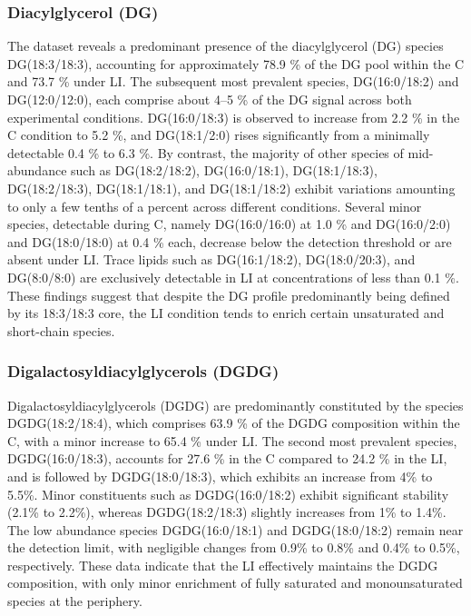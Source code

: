 \documentclass[10pt,letterpaper]{article}
\begin{document}
\subsubsection*{Diacylglycerol (DG)} 
The dataset reveals a predominant presence of the diacylglycerol (DG) species DG(18:3/18:3), accounting for approximately 78.9 \% of the DG pool within the C and 73.7 \% under LI. The subsequent most prevalent species, DG(16:0/18:2) and DG(12:0/12:0), each comprise about 4–5 \% of the DG signal across both experimental conditions. DG(16:0/18:3) is observed to increase from 2.2 \% in the C condition to 5.2 \%, and DG(18:1/2:0) rises significantly from a minimally detectable 0.4 \% to 6.3 \%. By contrast, the majority of other species of mid-abundance such as DG(18:2/18:2), DG(16:0/18:1), DG(18:1/18:3), DG(18:2/18:3), DG(18:1/18:1), and DG(18:1/18:2) exhibit variations amounting to only a few tenths of a percent across different conditions. Several minor species, detectable during C, namely DG(16:0/16:0) at 1.0 \% and DG(16:0/2:0) and DG(18:0/18:0) at 0.4 \% each, decrease below the detection threshold or are absent under LI. Trace lipids such as DG(16:1/18:2), DG(18:0/20:3), and DG(8:0/8:0) are exclusively detectable in LI  at concentrations of less than 0.1 \%. These findings suggest that despite the DG profile predominantly being defined by its 18:3/18:3 core, the LI condition tends to enrich certain unsaturated and short-chain species.

\subsubsection*{Digalactosyldiacylglycerols (DGDG)} 
Digalactosyldiacylglycerols (DGDG) are predominantly constituted by the species DGDG(18:2/18:4), which comprises 63.9 \% of the DGDG composition within the C, with a minor increase to 65.4 \% under LI. The second most prevalent species, DGDG(16:0/18:3), accounts for 27.6 \% in the C  compared to 24.2 \% in the LI, and is followed by DGDG(18:0/18:3), which exhibits an increase from 4\% to 5.5\%. Minor constituents such as DGDG(16:0/18:2) exhibit significant stability (2.1\% to 2.2\%), whereas DGDG(18:2/18:3) slightly increases from 1\% to 1.4\%. The low abundance species DGDG(16:0/18:1) and DGDG(18:0/18:2) remain near the detection limit, with negligible changes from 0.9\% to 0.8\% and 0.4\% to 0.5\%, respectively. These data indicate that the LI effectively maintains the DGDG composition, with only minor enrichment of fully saturated and monounsaturated species at the periphery.
\end{document}

